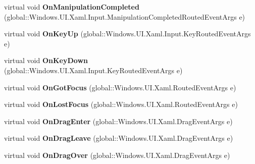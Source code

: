 \begin{DoxyCompactItemize}
virtual void {\bfseries On\+Manipulation\+Completed} (global\+::\+Windows.\+U\+I.\+Xaml.\+Input.\+Manipulation\+Completed\+Routed\+Event\+Args e)
\item 
\mbox{\label{class_windows_1_1_u_i_1_1_xaml_1_1_controls_1_1_control_a1b0d2df4f065db71ccbe2b00e5c5035f}} 
virtual void {\bfseries On\+Key\+Up} (global\+::\+Windows.\+U\+I.\+Xaml.\+Input.\+Key\+Routed\+Event\+Args e)
\item 
\mbox{\label{class_windows_1_1_u_i_1_1_xaml_1_1_controls_1_1_control_aaebebc38e0d403c52a9c26f0ce100664}} 
virtual void {\bfseries On\+Key\+Down} (global\+::\+Windows.\+U\+I.\+Xaml.\+Input.\+Key\+Routed\+Event\+Args e)
\item 
\mbox{\label{class_windows_1_1_u_i_1_1_xaml_1_1_controls_1_1_control_aebc0df2e4f8c22faf21c84575482274e}} 
virtual void {\bfseries On\+Got\+Focus} (global\+::\+Windows.\+U\+I.\+Xaml.\+Routed\+Event\+Args e)
\item 
\mbox{\label{class_windows_1_1_u_i_1_1_xaml_1_1_controls_1_1_control_a68f0c26b5b04bbbeb841be1d3a195224}} 
virtual void {\bfseries On\+Lost\+Focus} (global\+::\+Windows.\+U\+I.\+Xaml.\+Routed\+Event\+Args e)
\item 
\mbox{\label{class_windows_1_1_u_i_1_1_xaml_1_1_controls_1_1_control_ae5a8a218b89ca66425059a8e09fc0c0d}} 
virtual void {\bfseries On\+Drag\+Enter} (global\+::\+Windows.\+U\+I.\+Xaml.\+Drag\+Event\+Args e)
\item 
\mbox{\label{class_windows_1_1_u_i_1_1_xaml_1_1_controls_1_1_control_a1812d64c2440d2cd9f93660273ef5896}} 
virtual void {\bfseries On\+Drag\+Leave} (global\+::\+Windows.\+U\+I.\+Xaml.\+Drag\+Event\+Args e)
\item 
\mbox{\label{class_windows_1_1_u_i_1_1_xaml_1_1_controls_1_1_control_a5c8a657f99279b16e32bf35998d46838}} 
virtual void {\bfseries On\+Drag\+Over} (global\+::\+Windows.\+U\+I.\+Xaml.\+Drag\+Event\+Args e)

\end{DoxyCompactItemize}
